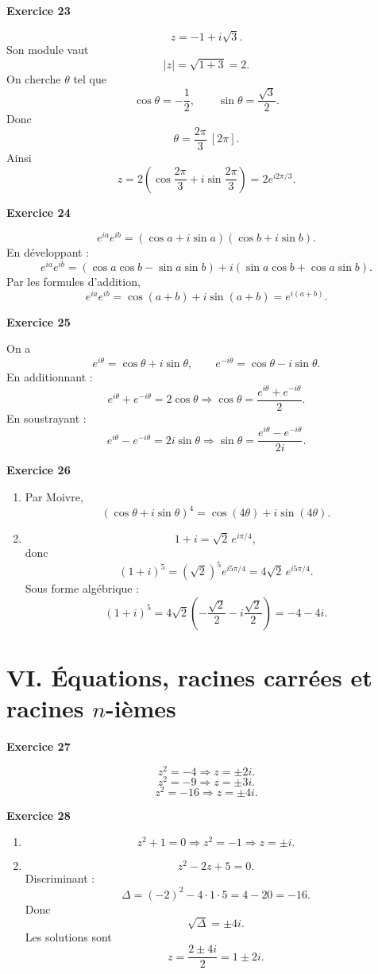 \documentclass[11pt,a4paper]{article}
\begin{document}
\textbf{Exercice 23}

\[
z=-1+i\sqrt3.
\]
Son module vaut
\[
|z|=\sqrt{1+3}=2.
\]
On cherche \(\theta\) tel que
\[
\cos\theta=-\frac12,\qquad \sin\theta=\frac{\sqrt3}{2}.
\]
Donc
\[
\theta=\frac{2\pi}{3}\ [2\pi].
\]
Ainsi
\[
z=2\left(\cos\frac{2\pi}{3}+i\sin\frac{2\pi}{3}\right)=2e^{i2\pi/3}.
\]

\textbf{Exercice 24}

\[
e^{ia}e^{ib}=(\cos a+i\sin a)(\cos b+i\sin b).
\]
En développant :
\[
e^{ia}e^{ib}=(\cos a\cos b-\sin a\sin b)+i(\sin a\cos b+\cos a\sin b).
\]
Par les formules d’addition,
\[
e^{ia}e^{ib}=\cos(a+b)+i\sin(a+b)=e^{i(a+b)}.
\]

\textbf{Exercice 25}

On a
\[
e^{i\theta}=\cos\theta+i\sin\theta,
\qquad
e^{-i\theta}=\cos\theta-i\sin\theta.
\]
En additionnant :
\[
e^{i\theta}+e^{-i\theta}=2\cos\theta
\Longrightarrow
\cos\theta=\frac{e^{i\theta}+e^{-i\theta}}{2}.
\]
En soustrayant :
\[
e^{i\theta}-e^{-i\theta}=2i\sin\theta
\Longrightarrow
\sin\theta=\frac{e^{i\theta}-e^{-i\theta}}{2i}.
\]

\textbf{Exercice 26}

\begin{enumerate}[label=\alph*)]
    \item Par Moivre,
    \[
    (\cos\theta+i\sin\theta)^4=\cos(4\theta)+i\sin(4\theta).
    \]

    \item
    \[
    1+i=\sqrt2\,e^{i\pi/4},
    \]
    donc
    \[
    (1+i)^5=(\sqrt2)^5 e^{i5\pi/4}=4\sqrt2\,e^{i5\pi/4}.
    \]
    Sous forme algébrique :
    \[
    (1+i)^5=4\sqrt2\left(-\frac{\sqrt2}{2}-i\frac{\sqrt2}{2}\right)=-4-4i.
    \]
\end{enumerate}

\section*{VI. Équations, racines carrées et racines \(n\)-ièmes}

\textbf{Exercice 27}

\[
z^2=-4 \Longrightarrow z=\pm 2i.
\]
\[
z^2=-9 \Longrightarrow z=\pm 3i.
\]
\[
z^2=-16 \Longrightarrow z=\pm 4i.
\]

\textbf{Exercice 28}

\begin{enumerate}
    \item
    \[
    z^2+1=0 \Longrightarrow z^2=-1 \Longrightarrow z=\pm i.
    \]

    \item
    \[
    z^2-2z+5=0.
    \]
    Discriminant :
    \[
    \Delta=(-2)^2-4\cdot 1\cdot 5=4-20=-16.
    \]
    Donc
    \[
    \sqrt{\Delta}=\pm 4i.
    \]
    Les solutions sont
    \[
    z=\frac{2\pm 4i}{2}=1\pm 2i.
    \]
\end{enumerate}
\end{document}
